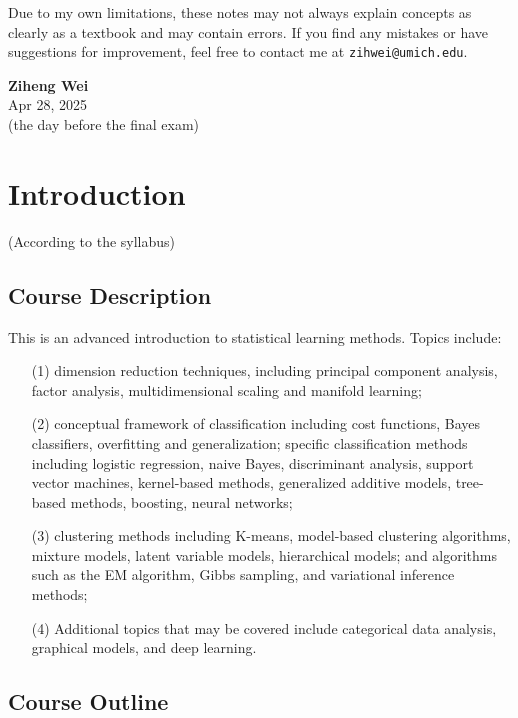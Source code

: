 \documentclass[12pt]{book}
\theoremstyle{definition}
\theoremstyle{remark}
\begin{document}
Due to my own limitations, these notes may not always explain concepts as clearly as a textbook and may contain errors. If you find any mistakes or have suggestions for improvement, feel free to contact me at \texttt{zihwei@umich.edu}.\\

\vfill
\begin{flushright}
\textbf{Ziheng Wei}\\
Apr 28, 2025\\
(the day before the final exam)
\end{flushright}




\chapter*{Introduction}
(According to the syllabus)
\section{Course Description}
This is an advanced introduction to statistical learning methods. Topics include:
\begin{enumerate}
    \item [(1)]dimension reduction techniques, including principal component analysis, factor analysis, multidimensional scaling and manifold learning; 
    \item[(2)] conceptual framework of classification including cost functions, Bayes classifiers, overfitting and generalization; specific classification methods including logistic regression, naive Bayes, discriminant analysis, support vector machines, kernel-based methods, generalized additive models, tree-based methods, boosting, neural networks;
    \item [(3)] clustering methods including K-means, model-based clustering algorithms, mixture models, latent variable models, hierarchical models; and algorithms such as the EM algorithm, Gibbs sampling, and variational inference methods;
    \item [(4)] Additional topics that may be covered include categorical data analysis, graphical models, and deep learning.
\end{enumerate}

\section{Course Outline}
\end{document}
